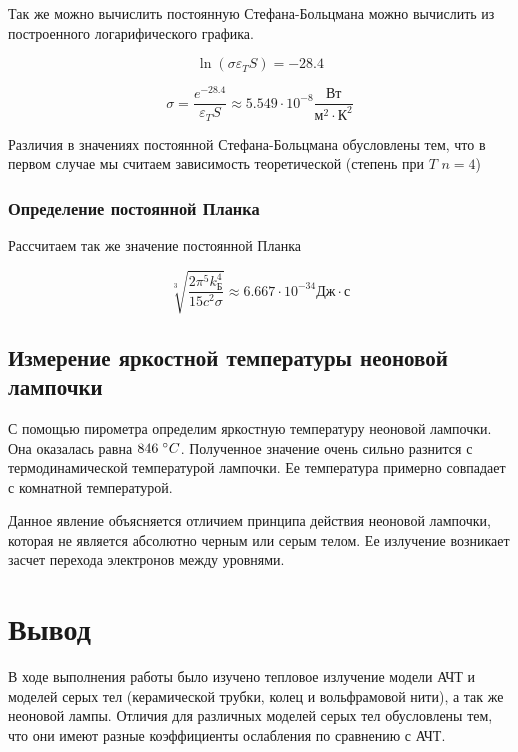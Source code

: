 \documentclass[12pt]{article}
\begin{document}
        Так же можно вычислить постоянную Стефана-Больцмана можно вычислить из
        построенного логарифического графика.

        $$
          \ln \left(\sigma \varepsilon_T S\right) = -28.4
        $$

        $$
          \sigma = \frac{e^{-28.4}}{\varepsilon_T S} \approx 5.549 \cdot 10^{-8}
          \frac{Вт}{м^2 \cdot К^2}
        $$

        Различия в значениях постоянной Стефана-Больцмана обусловлены тем, что в
        первом случае мы считаем зависимость теоретической (степень при $T$
        $n = 4$)

      \subsubsection{Определение постоянной Планка}

        Рассчитаем так же значение постоянной Планка

        $$
          \sqrt[3]{\frac{2 \pi^5 k_Б^4}{15 c^2 \sigma}} \approx
          6.667 \cdot 10^{-34} Дж \cdot с
        $$

    \subsection{Измерение яркостной температуры неоновой лампочки}

      С помощью пирометра определим яркостную температуру неоновой лампочки.
      Она оказалась равна $846 \hspace{0.1cm} ^{\circ} C$. Полученное значение
      очень сильно разнится с термодинамической температурой лампочки. Ее
      температура примерно совпадает с комнатной температурой.

      Данное явление объясняется отличием принципа действия неоновой лампочки,
      которая не является абсолютно черным или серым телом. Ее излучение
      возникает засчет перехода электронов между уровнями.

  \section{Вывод}

    В ходе выполнения работы было изучено тепловое излучение модели АЧТ и
    моделей серых тел (керамической трубки, колец и вольфрамовой нити), а так же
    неоновой лампы. Отличия для различных моделей серых тел обусловлены тем, что
    они имеют разные коэффициенты ослабления по сравнению с АЧТ.
\end{document}
